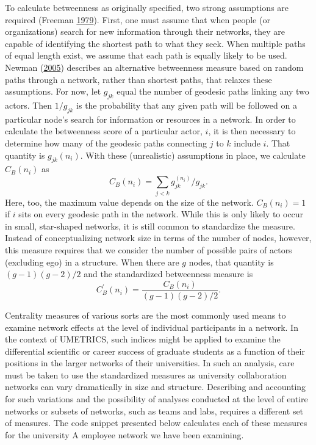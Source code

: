 \documentclass[]{krantz}
\begin{document}
To calculate betweenness as originally specified, two strong assumptions
are required (Freeman
\protect\hyperlink{ref-freeman1979centrality}{1979}). First, one must
assume that when people (or organizations) search for new information
through their networks, they are capable of identifying the shortest
path to what they seek. When multiple paths of equal length exist, we
assume that each path is equally likely to be used. Newman
(\protect\hyperlink{ref-newman2005measure}{2005}) describes an
alternative betweenness measure based on random paths through a network,
rather than shortest paths, that relaxes these assumptions. For now, let
\(g_{jk}\) equal the number of geodesic paths linking any two actors.
Then \(1/g_{jk}\) is the probability that any given path will be
followed on a particular node's search for information or resources in a
network. In order to calculate the betweenness score of a particular
actor, \(i\), it is then necessary to determine how many of the geodesic
paths connecting \(j\) to \(k\) include \(i\). That quantity is
\(g_{jk}(n_{i})\). With these (unrealistic) assumptions in place, we
calculate \(C_{B}(n_{i})\) as
\[C_B(n_i)=\sum_{j<k} g_{jk}^{(n_i)}/g_{jk}.\] Here, too, the maximum
value depends on the size of the network. \(C_{B}(n_{i}) = 1\) if \(i\)
sits on every geodesic path in the network. While this is only likely to
occur in small, star-shaped networks, it is still common to standardize
the measure. Instead of conceptualizing network size in terms of the
number of nodes, however, this measure requires that we consider the
number of possible pairs of actors (excluding ego) in a structure. When
there are \(g\) nodes, that quantity is \((g-1)(g-2)/2\) and the
standardized betweenness measure is
\[C_B^{\prime}(n_i)=\frac{C_B(n_i)}{(g-1)(g-2)/2}.\]

Centrality measures of various sorts are the most commonly used means to
examine network effects at the level of individual participants in a
network. In the context of UMETRICS, such indices might be applied to
examine the differential scientific or career success of graduate
students as a function of their positions in the larger networks of
their universities. In such an analysis, care must be taken to use the
standardized measures as university collaboration networks can vary
dramatically in size and structure. Describing and accounting for such
variations and the possibility of analyses conducted at the level of
entire networks or subsets of networks, such as teams and labs, requires
a different set of measures. The code snippet presented below calculates
each of these measures for the university A employee network we have
been examining.
\end{document}
